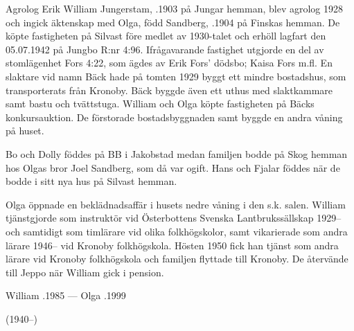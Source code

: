 %
Agrolog Erik William Jungerstam, .1903 på Jungar hemman, blev agrolog 1928 och ingick äktenskap med Olga, född Sandberg, .1904 på Finskas hemman. De köpte fastigheten på Silvast före medlet av 1930-talet och erhöll lagfart den 05.07.1942 på Jungbo R:nr 4:96. Ifrågavarande fastighet utgjorde en del av stomlägenhet Fors 4:22, som ägdes av Erik Fors' dödsbo; Kaisa Fors m.fl. En slaktare vid namn Bäck hade på tomten 1929 byggt ett mindre  bostadshus, som transporterats från Kronoby. Bäck byggde även ett uthus med slaktkammare samt bastu och tvättstuga. William och Olga köpte fastigheten på Bäcks konkursauktion. De förstorade bostadsbyggnaden samt byggde en andra våning på huset.
\begin{jhchildren}
  \item {}
  \item {}
  \item {}
  \item {}
\end{jhchildren}
Bo och Dolly föddes på BB i Jakobstad medan familjen bodde på Skog hemman hos Olgas bror Joel Sandberg, som då var ogift. Hans och Fjalar föddes när de bodde i sitt nya hus på Silvast hemman.


Olga öppnade en beklädnadsaffär i husets nedre våning i den s.k. salen.	William tjänstgjorde som instruktör vid Österbottens Svenska 	Lantbrukssällskap 1929-- och samtidigt som timlärare vid olika folkhögskolor, samt vikarierade som andra lärare 1946-- vid Kronoby folkhögskola. Hösten 1950 fick han tjänst som andra lärare vid Kronoby folkhögskola och familjen flyttade till Kronoby. De återvände till Jeppo när William gick i pension.

William .1985 	---  Olga .1999


 (1940--)

